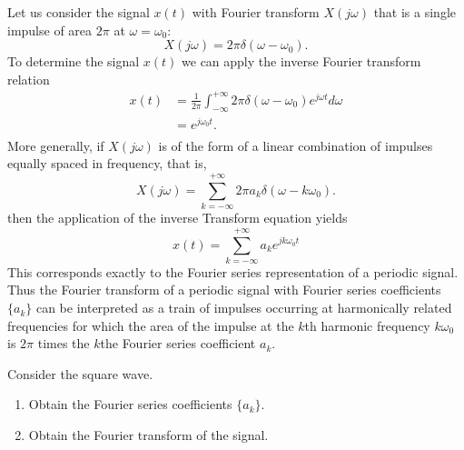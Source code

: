 \begin{frame}[allowframebreaks]
    Let us consider the signal $x(t)$ with Fourier transform $X(j\omega)$ that is a single impulse of area $2\pi$ at $\omega = \omega_0$:
    \begin{equation*}
        X(j\omega) = 2\pi \delta(\omega - \omega_0).
    \end{equation*}
    To determine the signal $x(t)$ we can apply the inverse Fourier transform relation
    \pause
    {
    \begin{equation*}
        \begin{split}
        x(t) &= \frac{1}{2\pi} \int_{-\infty}^{+\infty}2\pi \delta(\omega - \omega_0)e^{j\omega t}d\omega\\
        &= e^{j\omega_0 t}.\\
        \end{split}
    \end{equation*}
    More generally, if $X(j\omega)$ is of the form of a linear combination of impulses equally spaced in frequency, that is,
    \begin{equation*}
        X(j\omega) = \sum_{k=-\infty}^{+\infty}2\pi a_k \delta(\omega - k\omega_0).
    \end{equation*}
    then the application of the inverse Transform equation yields
    \begin{equation*}
        x(t) = \sum_{k=-\infty}^{+\infty}a_k e^{jk\omega_0 t}
    \end{equation*}
    }
    This corresponds exactly to the Fourier \alert{series} representation of a periodic signal.\\
    Thus the Fourier transform of a periodic signal with Fourier series coefficients $\{a_k\}$ can be interpreted as a train of impulses occurring at harmonically related frequencies for which the area of the impulse at the $k$th harmonic frequency $k\omega_0$ is $2\pi$ times the $k$the Fourier series coefficient $a_k$.
\end{frame}


\begin{frame}
    \begin{example}
        Consider the square wave.
        \begin{center}
            
        \end{center}
        \begin{enumerate}
            \item Obtain the Fourier series coefficients $\{a_k\}$.
            \item Obtain the Fourier transform of the signal.
        \end{enumerate}
    \end{example}
\end{frame}

